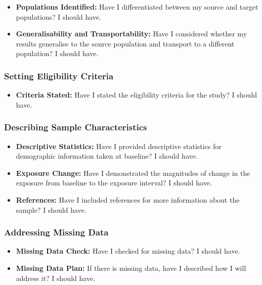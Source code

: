 \documentclass[
  singlecolumn]{article}
\providecommand{\tightlist}{%
  \setlength{\itemsep}{0pt}\setlength{\parskip}{0pt}}\usepackage{longtable,booktabs,array}
\begin{document}
\begin{itemize}
\tightlist
\item
  \textbf{Populations Identified:} Have I differentiated between my
  source and target populations? I should have.
\item
  \textbf{Generalisability and Transportability:} Have I considered
  whether my results generalise to the source population and transport
  to a different population? I should have.
\end{itemize}

\subsubsection{Setting Eligibility
Criteria}\label{setting-eligibility-criteria}

\begin{itemize}
\tightlist
\item
  \textbf{Criteria Stated:} Have I stated the eligibility criteria for
  the study? I should have.
\end{itemize}

\subsubsection{Describing Sample
Characteristics}\label{describing-sample-characteristics}

\begin{itemize}
\tightlist
\item
  \textbf{Descriptive Statistics:} Have I provided descriptive
  statistics for demographic information taken at baseline? I should
  have.
\item
  \textbf{Exposure Change:} Have I demonstrated the magnitudes of change
  in the exposure from baseline to the exposure interval? I should have.
\item
  \textbf{References:} Have I included references for more information
  about the sample? I should have.
\end{itemize}

\subsubsection{Addressing Missing Data}\label{addressing-missing-data}

\begin{itemize}
\tightlist
\item
  \textbf{Missing Data Check:} Have I checked for missing data? I should
  have.
\item
  \textbf{Missing Data Plan:} If there is missing data, have I described
  how I will address it? I should have.
\end{itemize}
\end{document}
